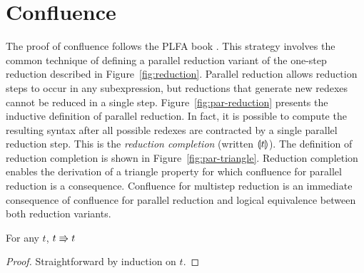 \section{Confluence}



The proof of confluence follows the PLFA book \cite{plfa22.08}.
This strategy involves the common technique of defining a parallel reduction variant of the one-step reduction described in Figure~\ref{fig:reduction}.
Parallel reduction allows reduction steps to occur in any subexpression, but reductions that generate new redexes cannot be reduced in a single step.
Figure~\ref{fig:par-reduction} presents the inductive definition of parallel reduction.
In fact, it is possible to compute the resulting syntax after all possible redexes are contracted by a single parallel reduction step.
This is the \textit{reduction completion} (written $\llparenthesis {t} \rrparenthesis$).
The definition of reduction completion is shown in Figure~\ref{fig:par-triangle}.
Reduction completion enables the derivation of a triangle property for which confluence for parallel reduction is a consequence.
Confluence for multistep reduction is an immediate consequence of confluence for parallel reduction and logical equivalence between both reduction variants.



\begin{lemma}
    For any $t$, $t \Rrightarrow t$
    \label{lem:a:par_refl}
\end{lemma}
\begin{proof}
    Straightforward by induction on $t$.
\end{proof}

